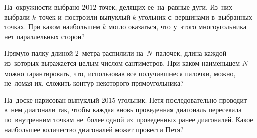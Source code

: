\begin{problems}
\item
На~окружности выбрано $2012$ точек, делящих ее~на~равные дуги.
Из~них выбрали $k$~точек и~построили выпуклый $k$-угольник с~вершинами
в~выбранных точках.
При каком наибольшем $k$ могло оказаться, что у~этого многоугольника нет
параллельных сторон?

\item
Прямую палку длиной 2~метра распилили на~$N$~палочек, длина каждой из~которых
выражается целым числом сантиметров.
При каком наименьшем $N$ можно гарантировать, что, использовав все получившиеся
палочки, можно, не~ломая их, сложить контур некоторого прямоугольника?

\item
На~доске нарисован выпуклый $2015$-угольник.
Петя последовательно проводит в~нем диагонали так, чтобы каждая вновь
проведенная диагональ пересекала по~внутренним точкам не~более одной
из~проведенных ранее диагоналей.
Какое наибольшее количество диагоналей может провести Петя?




\end{problems}


